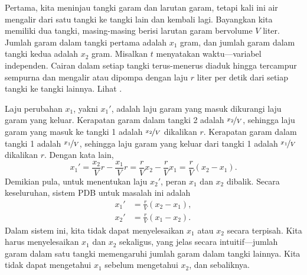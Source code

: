 \begin{example} \label{sintro:closedbrine-example}
Pertama, kita meninjau tangki garam dan larutan garam, tetapi kali ini air mengalir
dari satu tangki ke tangki lain dan kembali lagi.
Bayangkan kita memiliki dua tangki, masing-masing berisi larutan garam bervolume $V$ liter.
Jumlah garam dalam tangki pertama adalah $x_1$ gram, dan jumlah garam
dalam tangki kedua adalah $x_2$ gram.
Misalkan $t$ menyatakan waktu---variabel independen.
Cairan dalam setiap tangki terus-menerus
diaduk hingga tercampur sempurna dan
mengalir atau dipompa dengan laju $r$ liter per detik dari setiap tangki ke tangki lainnya.
Lihat .

\begin{myfig}
\capstart
{}
\caption{Sistem tertutup dua tangki larutan garam.\label{sintro:closedbrine}}
\end{myfig}

Laju perubahan $x_1$,
yakni $x_1'$, adalah
laju garam yang masuk dikurangi laju garam yang keluar.
Kerapatan garam dalam tangki 2 adalah $\nicefrac{x_2}{V}$,
sehingga laju garam yang masuk ke tangki 1 adalah
$\nicefrac{x_2}{V}$ dikalikan $r$.
Kerapatan garam dalam tangki 1 adalah $\nicefrac{x_1}{V}$,
sehingga laju garam yang keluar dari tangki 1 adalah
$\nicefrac{x_1}{V}$ dikalikan $r$.
Dengan kata lain,
\begin{equation*}
x_1' = \frac{x_2}{V} r - \frac{x_1}{V} r =
\frac{r}{V} x_2 - \frac{r}{V} x_1  = \frac{r}{V} (x_2-x_1).
\end{equation*}
Demikian pula, untuk menentukan laju $x_2'$, peran $x_1$ dan $x_2$
dibalik.  Secara keseluruhan, sistem PDB untuk masalah ini adalah
\begin{equation*}
\begin{aligned}
x_1' & = \frac{r}{V} (x_2-x_1), \\
x_2' & = \frac{r}{V} (x_1-x_2).
\end{aligned}
\end{equation*}
Dalam sistem ini, kita tidak dapat menyelesaikan $x_1$ atau $x_2$ secara terpisah.  Kita harus
menyelesaikan $x_1$ dan $x_2$ sekaligus,
yang jelas secara intuitif---jumlah garam dalam satu tangki
memengaruhi jumlah garam dalam tangki lainnya.
Kita tidak dapat mengetahui $x_1$ sebelum mengetahui $x_2$, dan sebaliknya.


\end{example}
